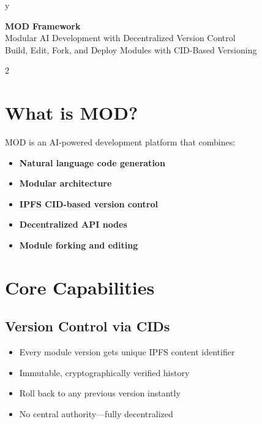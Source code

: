 y\documentclass[11pt,a4paper]{article}
\begin{document}
\begin{center}
{\Huge \textbf{\textcolor{primarycolor}{MOD Framework}}}\\
\vspace{0.3cm}
{\Large Modular AI Development with Decentralized Version Control}\\
\vspace{0.2cm}
{\large Build, Edit, Fork, and Deploy Modules with CID-Based Versioning}
\end{center}

\vspace{0.4cm}

\begin{multicols}{2}

\section*{\textcolor{primarycolor}{What is MOD?}}

MOD is an AI-powered development platform that combines:

\begin{itemize}
    \item \textbf{Natural language code generation}
    \item \textbf{Modular architecture}
    \item \textbf{IPFS CID-based version control}
    \item \textbf{Decentralized API nodes}
    \item \textbf{Module forking and editing}
\end{itemize}

\section*{\textcolor{primarycolor}{Core Capabilities}}

\subsection*{Version Control via CIDs}
\begin{itemize}
    \item Every module version gets unique IPFS content identifier
    \item Immutable, cryptographically verified history
    \item Roll back to any previous version instantly
    \item No central authority—fully decentralized
\end{itemize}


\end{multicols}
\end{document}
